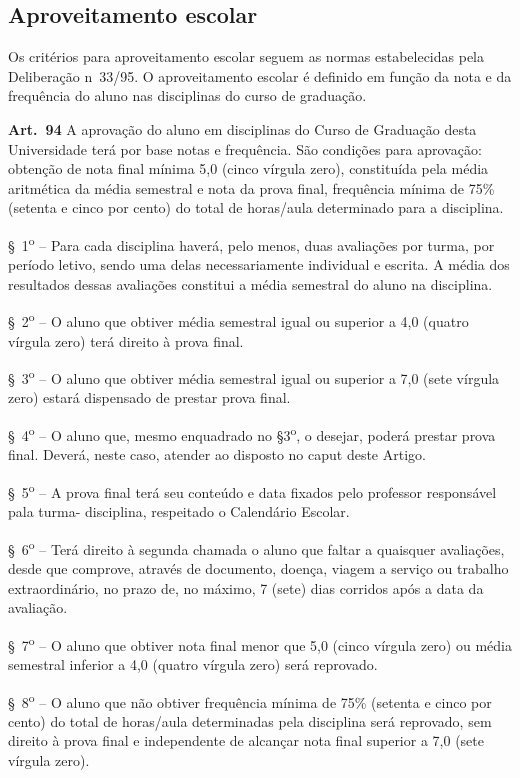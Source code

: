 \subsection{Aproveitamento escolar}
Os critérios para aproveitamento escolar seguem as normas estabelecidas pela Deliberação n\textordmasculine~33/95. O aproveitamento escolar é definido em função da nota e da frequência do aluno nas disciplinas do curso de graduação.
\begin{itquotation}

    \textbf{Art.~94} A aprovação do aluno em disciplinas do Curso de Graduação desta Universidade terá por base notas e frequência. São condições para aprovação: obtenção de nota final mínima 5,0 (cinco vírgula zero), constituída pela média aritmética da média semestral e nota da prova final, frequência mínima de 75\% (setenta e cinco por cento) do total de horas/aula determinado para a disciplina.

    \S~1\textsuperscript{o} -- Para cada disciplina haverá, pelo menos, duas avaliações por turma, por período letivo, sendo uma delas necessariamente individual e escrita. A média dos resultados dessas avaliações constitui a média semestral do aluno na disciplina.

    \S~2\textsuperscript{o} -- O aluno que obtiver média semestral igual ou superior a 4,0 (quatro vírgula zero) terá direito à prova final.

    \S~3\textsuperscript{o} -- O aluno que obtiver média semestral igual ou superior a 7,0 (sete vírgula zero) estará dispensado de prestar prova final.

    \S~4\textsuperscript{o} -- O aluno que, mesmo enquadrado no \S 3\textsuperscript{o}, o desejar, poderá prestar prova final. Deverá, neste caso, atender ao disposto no caput deste Artigo.

    \S~5\textsuperscript{o} -- A prova final terá seu conteúdo e data fixados pelo professor responsável pala turma-
    disciplina, respeitado o Calendário Escolar.

    \S~6\textsuperscript{o} -- Terá direito à segunda chamada o aluno que faltar a quaisquer avaliações, desde que
    comprove, através de documento, doença, viagem a serviço ou trabalho extraordinário, no prazo de,
    no máximo, 7 (sete) dias corridos após a data da avaliação.

    \S~7\textsuperscript{o} -- O aluno que obtiver nota final menor que 5,0 (cinco vírgula zero) ou média semestral inferior a 4,0 (quatro vírgula zero) será reprovado.

    \S~8\textsuperscript{o} -- O aluno que não obtiver frequência mínima de 75\% (setenta e cinco por cento) do total de horas/aula determinadas pela disciplina será reprovado, sem direito à prova final e independente de alcançar nota final superior a 7,0 (sete vírgula zero).
\end{itquotation}


